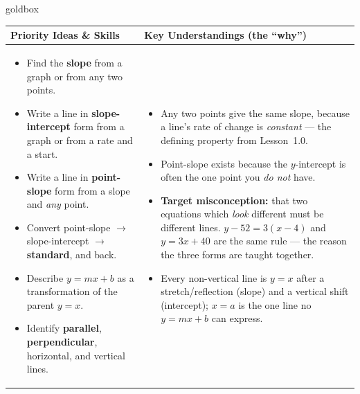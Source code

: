 \documentclass[10pt]{article}
\begin{document}
\renewcommand{\arraystretch}{1.4}
\begin{skillbox}{goldbox}
\begin{tabularx}{\linewidth}{@{}X|X@{}}
\textbf{Priority Ideas \& Skills} & \textbf{Key Understandings (the ``why'')} \\[2pt]
\hline
\vspace{-6pt}
\begin{itemize}[leftmargin=1.1em, nosep, after=\vspace{2pt}]
  \item Find the \textbf{slope} from a graph or from any two points.
  \item Write a line in \textbf{slope-intercept} form from a graph or from a rate and a start.
  \item Write a line in \textbf{point-slope} form from a slope and \emph{any} point.
  \item Convert point-slope $\to$ slope-intercept $\to$ \textbf{standard}, and back.
  \item Describe $y=mx+b$ as a transformation of the parent $y=x$.
  \item Identify \textbf{parallel}, \textbf{perpendicular}, horizontal, and vertical lines.
\end{itemize}
&
\vspace{-6pt}
\begin{itemize}[leftmargin=1.1em, nosep, after=\vspace{2pt}]
  \item Any two points give the same slope, because a line's rate of change is \emph{constant} ---
        the defining property from Lesson~1.0.
  \item Point-slope exists because the $y$-intercept is often the one point you \emph{do not} have.
  \item \textbf{Target misconception:} that two equations which \emph{look} different must be
        different lines. $y-52=3(x-4)$ and $y=3x+40$ are the same rule --- the reason the three
        forms are taught together.
  \item Every non-vertical line is $y=x$ after a stretch/reflection (slope) and a vertical shift
        (intercept); $x=a$ is the one line no $y=mx+b$ can express.
\end{itemize}
\end{tabularx}
\end{skillbox}
\end{document}
